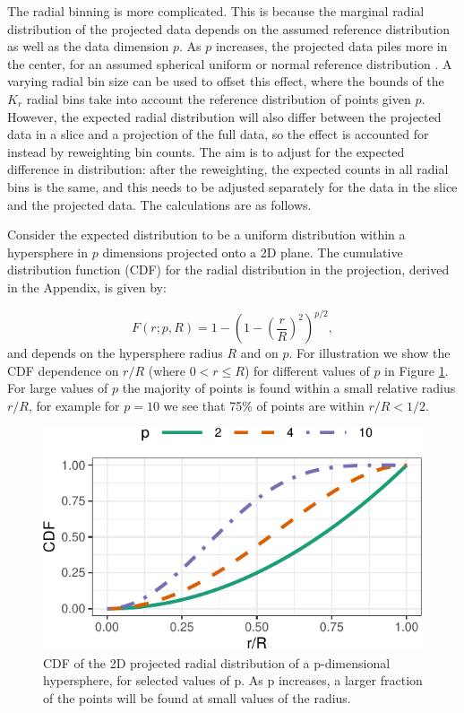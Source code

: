 \documentclass[]{interact}
\theoremstyle{plain}%
\theoremstyle{definition}
\theoremstyle{remark}
\begin{document}
The radial binning is more complicated. This is because the marginal
radial distribution of the projected data depends on the assumed
reference distribution as well as the data dimension \(p\). As \(p\)
increases, the projected data piles more in the center, for an assumed
spherical uniform or normal reference distribution \citep{burningsage}.
A varying radial bin size can be used to offset this effect, where the
bounds of the \(K_r\) radial bins take into account the reference
distribution of points given \(p\). However, the expected radial
distribution will also differ between the projected data in a slice and
a projection of the full data, so the effect is accounted for instead by
reweighting bin counts. The aim is to adjust for the expected difference
in distribution: after the reweighting, the expected counts in all
radial bins is the same, and this needs to be adjusted separately for
the data in the slice and the projected data. The calculations are as
follows.

Consider the expected distribution to be a uniform distribution within a
hypersphere in \(p\) dimensions projected onto a 2D plane. The
cumulative distribution function (CDF) for the radial distribution in
the projection, derived in the Appendix, is given by:

\begin{equation}
F(r;p,R) = 1-\left(1-\left(\frac{r}{R}\right)^2\right)^{p/2},
\label{eq:cdf}
\end{equation} and depends on the hypersphere radius \(R\) and on \(p\).
For illustration we show the CDF dependence on \(r/R\) (where
\(0<r\leq R\)) for different values of \(p\) in Figure \ref{fig:cdf}.
For large values of \(p\) the majority of points is found within a small
relative radius \(r/R\), for example for \(p=10\) we see that 75\% of
points are within \(r/R<1/2\).

\begin{figure}

{\centering \includegraphics[width=0.5\linewidth]{section_pursuit_files/figure-latex/cdf-1} 

}

\caption{CDF of the 2D projected radial distribution of a p-dimensional hypersphere, for selected values of p. As p increases, a larger fraction of the points will be found at small values of the radius.}\label{fig:cdf}
\end{figure}
\end{document}
